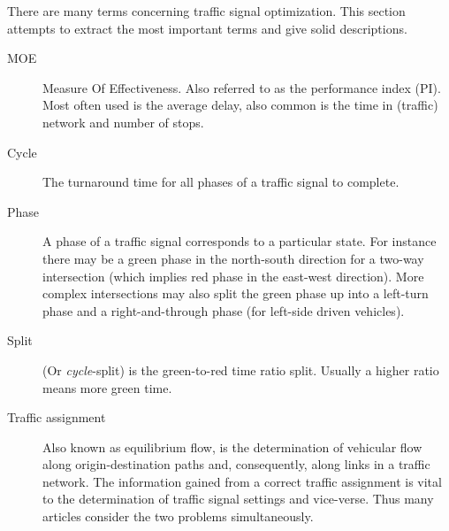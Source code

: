 \label{vocabulary}
There are many terms concerning traffic signal optimization. This section attempts to extract the most important terms and give solid descriptions.


\begin{description}
	\item[MOE] Measure Of Effectiveness. Also referred to as the performance index (PI).
	Most often used is the average delay, also common is the time in (traffic) network and number of stops. 
			
	\item[Cycle] The turnaround time for all phases of a traffic signal to complete.
	
	\item[Phase] A phase of a traffic signal corresponds to a particular state. 
	For instance there may be a green phase in the north-south direction for a two-way intersection (which implies red phase in the east-west direction).
	More complex intersections may also split the green phase up into a left-turn phase and a right-and-through phase (for left-side driven vehicles).
	
	\item[Split] (Or \textit{cycle}-split) is the green-to-red time ratio split. Usually a higher ratio means more green time.
	
	\item[Traffic assignment] Also known as equilibrium flow, is the determination of vehicular flow along origin-destination paths and, consequently, along links in a traffic network. The information gained from a correct traffic assignment is vital to the determination of traffic signal settings and vice-verse. Thus many articles consider the two problems simultaneously.
\end{description}
